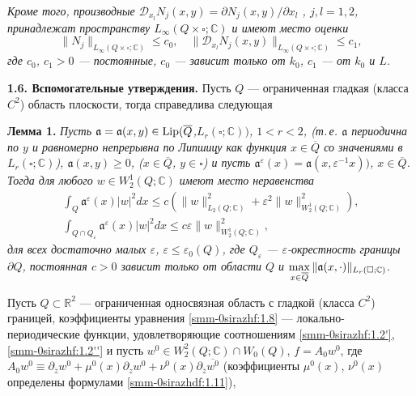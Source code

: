 \documentclass[a4paper,12pt]{article}
\theoremstyle{definition}
\begin{document}
{\it Кроме того, производные $\mathscr{D}_{x_l} N_j(x,y)={\partial N_j(x,y)}/{\partial x_l}$ , $j,l=1,2$,  принадлежат
	пространству $L_\infty(Q\times\square;\mathbb{C})$  и имеют место оценки}
\begin{equation}\label{smm-0sirazhdf:1.19}
	\|N_j\|_{L_\infty(Q\times\square;\mathbb{C})}\leqslant c_0,\quad \|
	\mathscr{D}_{x_l} N_j(x,y)\|_{L_\infty(Q\times\square;\mathbb{C})} \leqslant c_1,
\end{equation}
{\it где $c_0$, $c_1>0$ --- постоянные, $c_0$ --- зависит только от $k_0$, $c_1$ --- от $k_0$ и $L$.}

\smallskip
\textbf{1.6. Вспомогательные утверждения.}
Пусть $Q$ --- ограниченная гладкая (класса $C^2$) область плоскости,
тогда справедлива следующая

\smallskip
\textbf{Лемма 1.}
{\it Пусть $\mathfrak{a}=\mathfrak{a}(x,y)\in \text{\rm Lip}(\overline{Q}$,$L_r (\square;\mathbb{C}))$, $1<r<2$, (т.\,е. $\mathfrak{a}$  периодична по
	$y$ и равномерно непрерывна  по Липшицу как функция $x\in\overline{Q}$
	со значениями в $L_r (\square;\mathbb{C})$),  $\mathfrak{a}(x,y)\geqslant
	0$, {\rm ($x\in\overline{Q}$, $y\in\square$)}  и пусть  $\mathfrak{a}^\varepsilon(x)
	=\mathfrak{a}(x,\varepsilon^{-1} x))$, $x\in\overline{Q}$. Тогда для
	любого $w\in W_2^1 (Q;\mathbb{C})$ имеют место неравенства
	\begin{gather}\label{smm-0sirazhVf:1}
		\int_Q\mathfrak{a}^\varepsilon(x) |w|^2 dx\leqslant c\left(\|w\|_{L_2 (Q;\mathbb{C})}^2+
		\varepsilon^2 \|w\|_{W_2^1 (Q;\mathbb C)}^2 \right),  \\\label{smm-0sirazhVf:2}
		\int_{Q\cap Q_\varepsilon}\mathfrak{a}^\varepsilon(x) |w|^2 dx\leqslant c\varepsilon\|w\|_{W_2^1 (Q;\mathbb{C})}^2,
	\end{gather}
	для всех достаточно малых $\varepsilon$, $\varepsilon\leqslant\varepsilon_0
	(Q)$,
	где $Q_\varepsilon$ --- $\varepsilon$-окрестность границы $\partial Q$,
	постоянная $c>0$ зависит только от области $Q$ и $\mathop{\rm max}\limits_{x\in\overline{Q}}\|
	\mathfrak{a}(x,\cdot)\|_{L_r (\square;\mathbb C)}$}.




\smallskip
Пусть $Q\subset\mathbb{R}^2$ --- ограниченная
односвязная область с гладкой (класса $C^2$) границей,  коэффициенты
уравнения \eqref{smm-0sirazhf:1.8} ---  локально-периодические функции, удовлетворяющие соотношениям  \eqref{smm-0sirazhf:1.2'}, \eqref{smm-0sirazhf:1.2''} и пусть
$w^0\in W^2_2(Q;\mathbb{C})\cap W_0(Q)$, $f=A_0w^0$, где $A_0w^0\equiv\partial_{\overline{z}}w^0+\mu^0(x)\partial_zw^0+\nu^0(x)\partial_{\overline{z}}
\overline{w^0}$ (коэффициенты $\mu^0(x)$, $\nu^0(x)$   определены  формулами \eqref{smm-0sirazhdf:1.11}),
\end{document}
